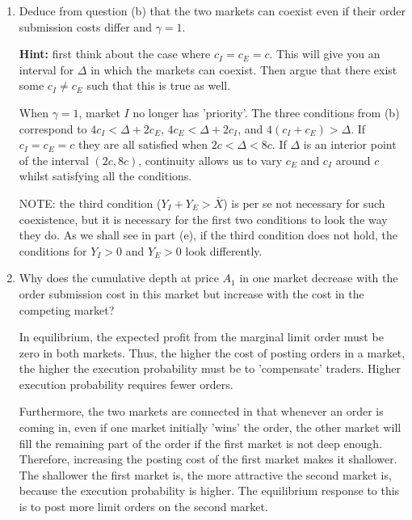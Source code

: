 \documentclass[11pt
, answers
]{exam}
\begin{document}
\begin{enumerate}[label=(\alph*). ]
	
	
	\item Deduce from question (b) that the two markets can coexist even if their order submission costs differ and $\gamma=1$. 
	
	\textbf{Hint:} first think about the case where $c_{I}=c_{E}=c$. This will give you an interval for $\Delta$ in which the markets can coexist. Then argue that there exist some $c_{I} \ne c_{E}$ such that this is true as well.
	
	\begin{solution}
		When $\gamma=1$, market $I$ no longer has 'priority'. The three conditions from (b) correspond to $4c_{I} < \Delta + 2c_{E}$, $4c_{E}<\Delta+2c_{I}$, and $4(c_{I}+c_{E})>\Delta$. If $c_{I}=c_{E}=c$ they are all satisfied when $2c < \Delta < 8c$. If $\Delta$ is an interior point of the interval $(2c, 8c)$, continuity allows us to vary $c_{E}$ and $c_{I}$ around $c$ whilst satisfying all the conditions.
		
		NOTE: the third condition ($Y_I+Y_E > \bar{X}$) is per se not necessary for such coexistence, but it is necessary for the first two conditions to look the way they do. As we shall see in part (e), if the third condition does not hold, the conditions for $Y_I > 0$ and $Y_E > 0$ look differently.
	\end{solution}
	
	
	
	\item Why does the cumulative depth at price $A_{1}$ in one market decrease with the order submission cost in this market but increase with the cost in the competing market?
	
	\begin{solution}
		In equilibrium, the expected profit from the marginal limit order must be zero in both markets. Thus, the higher the cost of posting orders in a market, the higher the execution probability must be to 'compensate' traders. Higher execution probability requires fewer orders. 
		
		Furthermore, the two markets are connected in that whenever an order is coming in, even if one market initially 'wins' the order, the other market will fill the remaining part of the order if the first market is not deep enough. Therefore, increasing the posting cost of the first market makes it shallower. The shallower the first market is, the more attractive the second market is, because the execution probability is higher. The equilibrium response to this is to post more limit orders on the second market. 
	\end{solution}
	

\end{enumerate}
\end{document}
